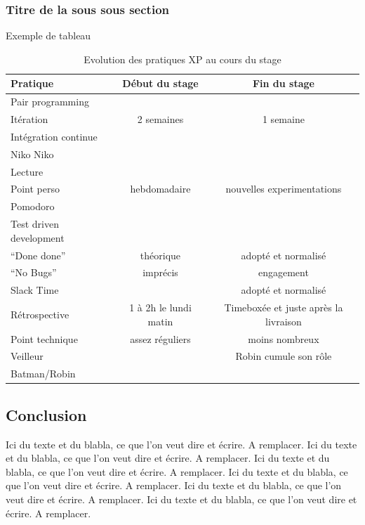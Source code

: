 \subsubsection{Titre de la sous sous section}

Exemple de tableau
\begin{table}[!ht]
	\caption{\label{tableau:evolPratXP}Evolution des pratiques XP au cours du stage}
	\begin{tabular}{|l|c|c|}
		\hline
		Pratique & Début du stage & Fin du stage\\
		\hline
		Pair programming & \tick & \tick \\
		Itération & 2 semaines & 1 semaine \\
		Intégration continue & \tick & \tick \\
		Niko Niko & \tick & \badtick \\
		Lecture & \tick & \badtick \\
		Point perso & hebdomadaire & nouvelles experimentations\\
		Pomodoro & \badtick & \tick \\
		Test driven development & \tick & \tick \\
		``Done done'' & théorique & adopté et normalisé\\
		``No Bugs'' & imprécis & engagement \\
		Slack Time & \badtick & adopté et normalisé\\
		Rétrospective & 1 à 2h le lundi matin & Timeboxée et juste après la livraison\\
		Point technique & assez réguliers & moins nombreux\\
		Veilleur & \tick & Robin cumule son rôle\\
		Batman/Robin & \badtick & \tick \\
		\hline
	\end{tabular}
\end{table}

\subsection{Conclusion}

Ici du texte et du blabla, ce que l'on veut dire et écrire. A remplacer. Ici du texte et du blabla, ce que l'on veut dire et écrire. A remplacer. Ici du texte et du blabla, ce que l'on veut dire et écrire. A remplacer. Ici du texte et du blabla, ce que l'on veut dire et écrire. A remplacer. Ici du texte et du blabla, ce que l'on veut dire et écrire. A remplacer. Ici du texte et du blabla, ce que l'on veut dire et écrire. A remplacer.

